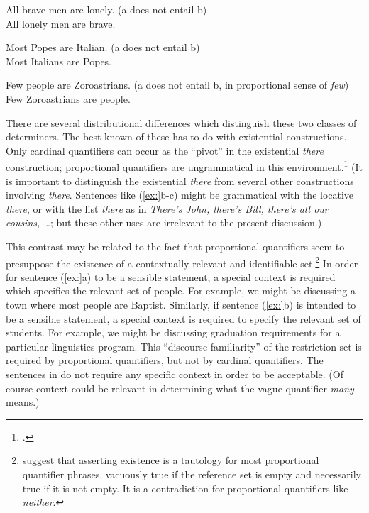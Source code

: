 \ea
\ea All brave men are lonely.   (a does not entail b)\\
\ex All lonely men are brave.
                       \z
\z

\ea
\ea  Most Popes are Italian.   (a does not entail b)\\
\ex Most Italians are Popes.
\z \z

\ea
\ea Few people are Zoroastrians.   (a does not entail b, in proportional sense of \textit{few})\\
\ex Few Zoroastrians are people.
                       \z
\z


There are several distributional differences which distinguish these two classes of determiners. The best known of these has to do with existential constructions. Only cardinal quantifiers can occur as the “pivot” in the existential \textit{there} construction; proportional quantifiers are ungrammatical in this environment.\footnote{\citet{Milsark1977}.} (It is important to distinguish the existential \textit{there} from several other constructions involving \textit{there}. Sentences like (\ref{ex:}b-c) might be grammatical with the locative \textit{there}, or with the list \textit{there} as in \textit{There’s John, there’s Bill, there’s all our cousins, …}; but these other uses are irrelevant to the present discussion.)


\ea
{}
                       \z
\z


This contrast may be related to the fact that proportional quantifiers seem to presuppose the existence of a contextually relevant and identifiable set.\footnote{\citet{BarwiseCooper1981} suggest that asserting existence is a tautology for most proportional quantifier phrases, vacuously true if the reference set is empty and necessarily true if it is not empty. It is a contradiction for proportional quantifiers like \textit{neither}.} In order for sentence (\ref{ex:}a) to be a sensible statement, a special context is required which specifies the relevant set of people. For example, we might be discussing a town where most people are Baptist. Similarly, if sentence (\ref{ex:}b) is intended to be a sensible statement, a special context is required to specify the relevant set of students. For example, we might be discussing graduation requirements for a particular linguistics program. This “discourse familiarity” of the restriction set is required by proportional quantifiers, but not by cardinal quantifiers. The sentences in  do not require any specific context in order to be acceptable. (Of course context could be relevant in determining what the vague quantifier \textit{many} means.)


